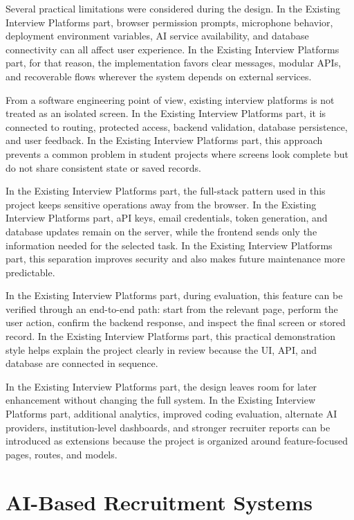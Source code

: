 \documentclass[12pt,a4paper]{report}
\begin{document}
Several practical limitations were considered during the design. In the Existing Interview Platforms part, browser permission prompts, microphone behavior, deployment environment variables, AI service availability, and database connectivity can all affect user experience. In the Existing Interview Platforms part, for that reason, the implementation favors clear messages, modular APIs, and recoverable flows wherever the system depends on external services.


From a software engineering point of view, existing interview platforms is not treated as an isolated screen. In the Existing Interview Platforms part, it is connected to routing, protected access, backend validation, database persistence, and user feedback. In the Existing Interview Platforms part, this approach prevents a common problem in student projects where screens look complete but do not share consistent state or saved records.


In the Existing Interview Platforms part, the full-stack pattern used in this project keeps sensitive operations away from the browser. In the Existing Interview Platforms part, aPI keys, email credentials, token generation, and database updates remain on the server, while the frontend sends only the information needed for the selected task. In the Existing Interview Platforms part, this separation improves security and also makes future maintenance more predictable.


In the Existing Interview Platforms part, during evaluation, this feature can be verified through an end-to-end path: start from the relevant page, perform the user action, confirm the backend response, and inspect the final screen or stored record. In the Existing Interview Platforms part, this practical demonstration style helps explain the project clearly in review because the UI, API, and database are connected in sequence.


In the Existing Interview Platforms part, the design leaves room for later enhancement without changing the full system. In the Existing Interview Platforms part, additional analytics, improved coding evaluation, alternate AI providers, institution-level dashboards, and stronger recruiter reports can be introduced as extensions because the project is organized around feature-focused pages, routes, and models.


\section{AI-Based Recruitment Systems}
\end{document}
